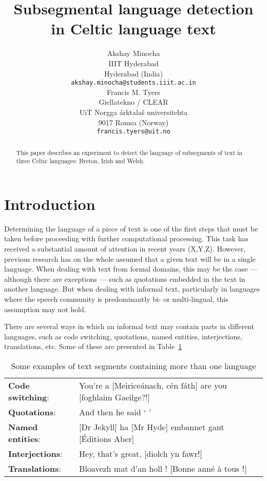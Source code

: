 \documentclass[11pt]{article}
\title{Subsegmental language detection in Celtic language text}
\author{Akshay Minocha \\
  IIIT Hyderabad  \\
  Hyderabad (India) \\
  {\small {\tt akshay.minocha@students.iiit.ac.in}} \\\And
  Francis M. Tyers \\
  Giellatekno / CLEAR \\
  UiT Norgga \'arktala\v{s} universitehta  \\
  9017 Romsa (Norway) \\
  {\small {\tt francis.tyers@uit.no}} \\}
\date{}
\begin{document}
\maketitle
\begin{abstract}
  This paper describes an experiment to detect the language of subsegments
  of text in three Celtic languages: Breton, Irish and Welsh. 
\end{abstract}

\section{Introduction}
\label{intro}

Determining the language of a piece of text is one of the first steps that must be taken
before proceeding with further computational processing. This task has received a substantial amount of
attention in recent years (X,Y,Z). However, previous research has on the whole assumed
that a given text will be in a single language. When dealing with text from formal domains,
this may be the case --- although there are exceptions --- such as quotations embedded in
the text in another language. But when dealing with informal text, particularly in languages
where the speech community is predominantly bi- or multi-lingual, this assumption may not hold.

There are several ways in which an informal text may contain parts in different languages, such as
code switching, quotations, named entities, interjections, translations, etc. Some of these are presented
in Table~\ref{table:examples}

\begin{table}
\begin{tabular}{ll}
 \textbf{Code switching}: & You're a [Meiriceánach, cén fáth] are you [foghlaim Gaeilge?!] \\
\textbf{Quotations}: & And then he said ` ' \\
 \textbf{Named entities}: & [Dr Jekyll] ha [Mr Hyde] embannet gant [\'{E}ditions Aber] \\
 \textbf{Interjections}: & Hey, that's great, [diolch yn fawr!] \\
 \textbf{Translations}: & Bloavezh mat d'an holl ! [Bonne ann\'{e} \`{a} tous !] \\
\end{tabular}
\label{table:examples}
\caption{Some examples of text segments containing more than one language}
\end{table}
\end{document}
